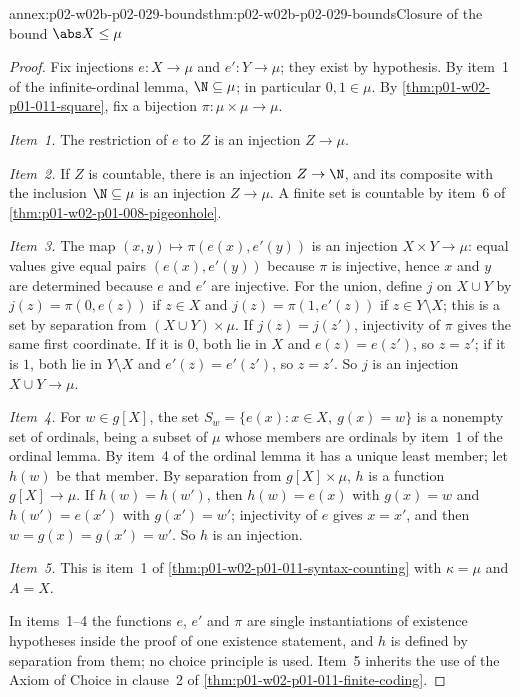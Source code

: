 \begin{annexitem}{annex:p02-w02b-p02-029-bounds}{thm:p02-w02b-p02-029-bounds}{Closure of the bound \(\abs X\leq\mu\)}
\begin{proof}
Fix injections \(e:X\to\mu\) and \(e':Y\to\mu\); they exist by hypothesis.
By item~1 of the infinite-ordinal lemma, \(\N\subseteq\mu\); in particular
\(0,1\in\mu\). By \cref{thm:p01-w02-p01-011-square}, fix a bijection
\(\pi:\mu\times\mu\to\mu\).

\emph{Item~1.} The restriction of \(e\) to \(Z\) is an injection
\(Z\to\mu\).

\emph{Item~2.} If \(Z\) is countable, there is an injection \(Z\to\N\), and
its composite with the inclusion \(\N\subseteq\mu\) is an injection
\(Z\to\mu\). A finite set is countable by item~6 of
\cref{thm:p01-w02-p01-008-pigeonhole}.

\emph{Item~3.} The map \((x,y)\mapsto\pi(e(x),e'(y))\) is an injection
\(X\times Y\to\mu\): equal values give equal pairs \((e(x),e'(y))\) because
\(\pi\) is injective, hence \(x\) and \(y\) are determined because \(e\) and
\(e'\) are injective. For the union, define \(j\) on \(X\cup Y\) by
\(j(z)=\pi(0,e(z))\) if \(z\in X\) and \(j(z)=\pi(1,e'(z))\) if
\(z\in Y\setminus X\); this is a set by separation from
\((X\cup Y)\times\mu\). If \(j(z)=j(z')\), injectivity of \(\pi\) gives the
same first coordinate. If it is \(0\), both lie in \(X\) and
\(e(z)=e(z')\), so \(z=z'\); if it is \(1\), both lie in \(Y\setminus X\) and
\(e'(z)=e'(z')\), so \(z=z'\). So \(j\) is an injection
\(X\cup Y\to\mu\).

\emph{Item~4.} For \(w\in g[X]\), the set
\(S_w=\{e(x):x\in X,\ g(x)=w\}\) is a nonempty set of ordinals, being a
subset of \(\mu\) whose members are ordinals by item~1 of the ordinal lemma.
By item~4 of the ordinal lemma it has a unique least member; let \(h(w)\) be
that member. By separation from \(g[X]\times\mu\), \(h\) is a function
\(g[X]\to\mu\). If \(h(w)=h(w')\), then \(h(w)=e(x)\) with \(g(x)=w\) and
\(h(w')=e(x')\) with \(g(x')=w'\); injectivity of \(e\) gives \(x=x'\), and
then \(w=g(x)=g(x')=w'\). So \(h\) is an injection.

\emph{Item~5.} This is item~1 of
\cref{thm:p01-w02-p01-011-syntax-counting} with \(\kappa=\mu\) and
\(A=X\).

In items~1--4 the functions \(e\), \(e'\) and \(\pi\) are single
instantiations of existence hypotheses inside the proof of one existence
statement, and \(h\) is defined by separation from them; no choice principle
is used. Item~5 inherits the use of the Axiom of Choice in clause~2 of
\cref{thm:p01-w02-p01-011-finite-coding}.
\end{proof}
\end{annexitem}

